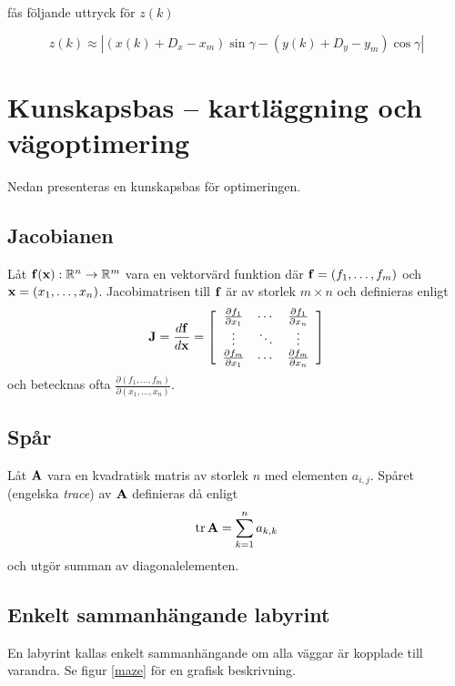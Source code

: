 \documentclass[11pt]{article}
\newcommand{\bfr}[1]{\textbf{\textrm{{#1}}}}
\begin{document}
\begin{flushleft}
fås följande uttryck för $z(k)$

\begin{equation}
	z(k) \approx |(x(k) + D_x - x_m) \sin \gamma - (y(k) + D_y - y_m) \cos \gamma |
\end{equation}

\section{Kunskapsbas -- kartläggning och vägoptimering}
Nedan presenteras en kunskapsbas för optimeringen.
\subsection{Jacobianen}
Låt $\bfr{f}(\bfr{x}):\mathbb{R}^{n}\rightarrow\mathbb{R}^{m}$ vara en vektorvärd funktion där $\bfr{f}=\left(f_1,\ldots,f_m\right)$ och $\bfr{x}=\left(x_1,\ldots,x_n\right)$. Jacobimatrisen till $\bfr{f}$ är av storlek $m\times n$ och definieras enligt
\begin{equation*}
	\bfr{J} = \frac{d\bfr{f}}{d\bfr{x}} = \left[ \begin{array}{ccc}
		\frac{\partial f_1}{\partial x_1} & \cdots & \frac{\partial f_1}{\partial x_n} \\
		\vdots & \ddots & \vdots \\
		\frac{\partial f_m}{\partial x_1} & \cdots & \frac{\partial f_m}{\partial x_n}
	\end{array} \right]
\end{equation*}
och betecknas ofta $\frac{\partial \left(f_1,\ldots,f_m\right)}{\partial \left(x_1,\ldots,x_n \right)}$.

\subsection{Spår}
Låt $\bfr{A}$ vara en kvadratisk matris av storlek $n$ med elementen $a_{i,j}$. Spåret (engelska \emph{trace}) av $\bfr{A}$ definieras då enligt
\begin{equation*}
	\mathrm{tr}\,\bfr{A} = \sum_{k=1}^{n} a_{k,k}
\end{equation*}
och utgör summan av diagonalelementen.

\subsection{Enkelt sammanhängande labyrint}
En labyrint kallas enkelt sammanhängande om alla väggar är kopplade till varandra. Se figur \ref{maze} för en grafisk beskrivning.


\end{flushleft}
\end{document}
